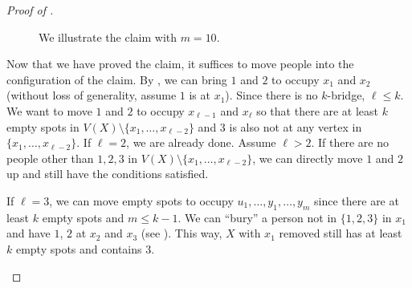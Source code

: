 \documentclass{mystyle}
\begin{document}
\begin{proof}[Proof of ]
\begin{figure}[ht]
            \caption{We illustrate the claim with $m = 10$.}
            \label{fig_20}
    \end{figure}
    
    Now that we have proved the claim, it suffices to move people into the configuration of the claim. By , we can bring $1$ and $2$ to occupy $x_1$ and $x_2$ (without loss of generality, assume $1$ is at $x_1$). Since there is no $k$-bridge, $\ell \leq k$. We want to move $1$ and $2$ to occupy $x_{\ell -1}$ and $x_{\ell}$ so that there are at least $k$ empty spots in $V(X) \setminus \{x_1, \ldots, x_{\ell -2}\}$ and $3$ is also not at any vertex in $\{x_1, \ldots, x_{\ell -2}\}$. If $\ell = 2$, we are already done. Assume $\ell > 2$. If there are no people other than $1, 2, 3$ in $V(X) \setminus \{x_1, \ldots, x_{\ell - 2}\}$, we can directly move $1$ and $2$ up and still have the conditions satisfied. 

    If $\ell = 3$, we can move empty spots to occupy $u_1, \ldots, y_1, \ldots, y_{m}$ since there are at least $k$ empty spots and $m \leq k - 1$. We can ``bury'' a person not in $\{1, 2, 3\}$ in $x_1$ and have $1$, $2$ at $x_2$ and $x_3$ (see ). This way, $X$ with $x_1$ removed still has at least $k$ empty spots and contains $3$. 

    \begin{figure}[ht]
        \centering
\end{figure}
\end{proof}
\end{document}
